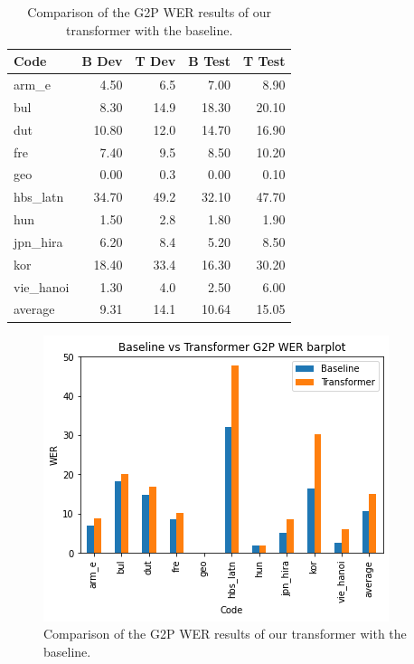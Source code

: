 \documentclass[11pt,a4paper]{article}
\begin{document}
\begin{table}[ht]
\centering
\begin{tabular}{lrrrr}
\toprule
      Code &  B Dev &  T Dev &  B Test &  T Test \\
\midrule
     arm\_e &          4.50 &   6.5 &           7.00 &   8.90 \\
       bul &          8.30 &  14.9 &          18.30 &  20.10 \\
       dut &         10.80 &  12.0 &          14.70 &  16.90 \\
       fre &          7.40 &   9.5 &           8.50 &  10.20 \\
       geo &          0.00 &   0.3 &           0.00 &   0.10 \\
  hbs\_latn &         34.70 &  49.2 &          32.10 &  47.70 \\
       hun &          1.50 &   2.8 &           1.80 &   1.90 \\
  jpn\_hira &          6.20 &   8.4 &           5.20 &   8.50 \\
       kor &         18.40 &  33.4 &          16.30 &  30.20 \\
 vie\_hanoi &          1.30 &   4.0 &           2.50 &   6.00 \\
\midrule
   average &          9.31 &  14.1 &          10.64 &  15.05 \\
\bottomrule
\end{tabular}
\caption{Comparison of the G2P WER results of our transformer with the baseline.}
\label{tab:baseline}
\end{table}

\begin{figure}[ht]
    \centering
    \includegraphics[width=\linewidth]{g2p_baseline.png}
    \caption{Comparison of the G2P WER results of our transformer with the baseline.}
    \label{fig:g2p_baseline}
\end{figure}
\end{document}
